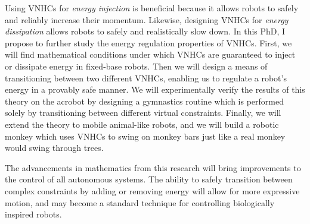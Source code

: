 \documentclass[a4paper,12pt]{article}
\begin{document}
Using VNHCs for \textit{energy injection} is beneficial because it allows robots to
safely and reliably increase their momentum.
Likewise, designing VNHCs for \textit{energy dissipation} allows robots to
safely and realistically slow down.
In this PhD, I propose to further study the energy regulation properties of VNHCs.
First, we will find mathematical conditions under which VNHCs are guaranteed to
inject or dissipate energy in fixed-base robots.
Then we will design a means of transitioning between two different VNHCs,
enabling us to regulate a robot's energy in a provably safe manner.
We will experimentally verify the results of this theory on the acrobot by
designing a gymnastics routine which is performed solely by transitioning
between different virtual constraints.
Finally, we will extend the theory to mobile animal-like robots,
and we will build a robotic monkey which uses VNHCs to swing on monkey bars just
like a real monkey would swing through trees.

The advancements in mathematics from this research will bring improvements
to the control of all autonomous systems. 
The ability to safely transition between complex constraints by adding or
removing energy will allow for more expressive motion, and may become a standard
technique for controlling biologically inspired robots.

\newpage
\printbibliography
\end{document}
